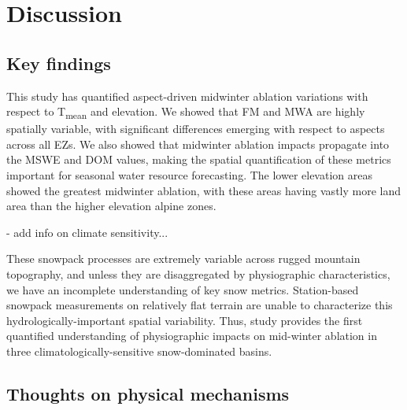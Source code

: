 \hypertarget{ch2-discussion}{\section{Discussion}\label{ch2-discussion}}
\hypertarget{ch2-discussion}{\subsection{Key findings}\label{ch2-discussion}}


This study has quantified aspect-driven midwinter ablation variations with respect to T\textsubscript{mean} and elevation. We showed that FM and MWA are highly spatially variable, with significant differences emerging with respect to aspects across all EZs. We also showed that midwinter ablation impacts propagate into the MSWE and DOM values, making the spatial quantification of these metrics important for seasonal water resource forecasting. The lower elevation areas showed the greatest midwinter ablation, with these areas having vastly more land area than the higher elevation alpine zones.

- add info on climate sensitivity...

These snowpack processes are extremely variable across rugged mountain topography, and unless they are disaggregated by physiographic characteristics, we have an incomplete understanding of key snow metrics. Station-based snowpack measurements on relatively flat terrain are unable to characterize this hydrologically-important spatial variability. Thus, study provides the first quantified understanding of physiographic impacts on mid-winter ablation in three climatologically-sensitive snow-dominated basins. 


\hypertarget{ch2-discussion}{\subsection{Thoughts on physical mechanisms}\label{ch2-discussion}}

